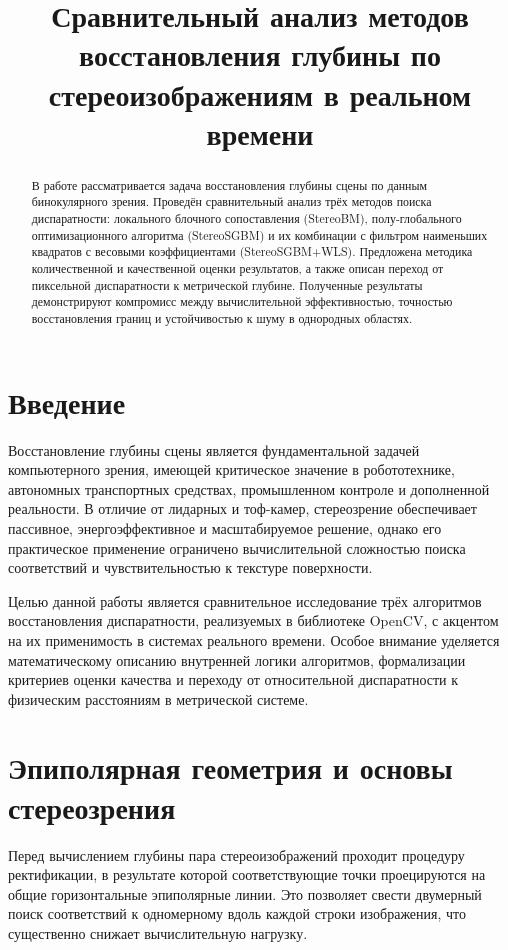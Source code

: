 

\title{Сравнительный анализ методов восстановления глубины по стереоизображениям в реальном времени}
\author{}
\date{}


	\maketitle
	
	\begin{abstract}
		В работе рассматривается задача восстановления глубины сцены по данным бинокулярного зрения. Проведён сравнительный анализ трёх методов поиска диспаратности: локального блочного сопоставления (StereoBM), полу-глобального оптимизационного алгоритма (StereoSGBM) и их комбинации с фильтром наименьших квадратов с весовыми коэффициентами (StereoSGBM+WLS). Предложена методика количественной и качественной оценки результатов, а также описан переход от пиксельной диспаратности к метрической глубине. Полученные результаты демонстрируют компромисс между вычислительной эффективностью, точностью восстановления границ и устойчивостью к шуму в однородных областях.
	\end{abstract}
	
	\section{Введение}
	Восстановление глубины сцены является фундаментальной задачей компьютерного зрения, имеющей критическое значение в робототехнике, автономных транспортных средствах, промышленном контроле и дополненной реальности. В отличие от лидарных и тоф-камер, стереозрение обеспечивает пассивное, энергоэффективное и масштабируемое решение, однако его практическое применение ограничено вычислительной сложностью поиска соответствий и чувствительностью к текстуре поверхности.
	
	Целью данной работы является сравнительное исследование трёх алгоритмов восстановления диспаратности, реализуемых в библиотеке OpenCV, с акцентом на их применимость в системах реального времени. Особое внимание уделяется математическому описанию внутренней логики алгоритмов, формализации критериев оценки качества и переходу от относительной диспаратности к физическим расстояниям в метрической системе.
	
	\section{Эпиполярная геометрия и основы стереозрения}
	Перед вычислением глубины пара стереоизображений проходит процедуру ректификации, в результате которой соответствующие точки проецируются на общие горизонтальные эпиполярные линии. Это позволяет свести двумерный поиск соответствий к одномерному вдоль каждой строки изображения, что существенно снижает вычислительную нагрузку.
	
